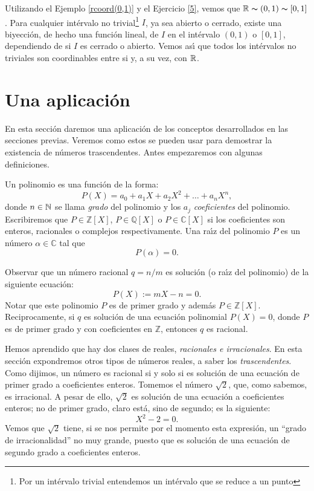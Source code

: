 Utilizando el Ejemplo \vref{rcoord(0,1)} y el Ejercicio \vref{5},
vemos que $\rr\thicksim (0,1)\thicksim [0,1]$. Para cualquier
int\'ervalo no trivial\footnote{Por un int\'ervalo trivial
entendemos un int\'ervalo que se reduce a un punto} $I$,  ya sea
abierto o cerrado, existe una biyecci\'on, de hecho una funci\'on
lineal, de $I$ en el int\'ervalo $(0,1)$ o $[0,1]$, dependiendo de
si $I$ es cerrado o abierto. Vemos as\'{\i} que todos los
int\'ervalos no triviales son coordinables entre si y, a su vez,
con $\rr$.

\section{Una aplicaci\'on}
En esta secci\'on daremos una aplicaci\'on de los conceptos
desarrollados en las secciones previas. Veremos como estos se
pueden usar para demostrar la existencia de n\'umeros
trascendentes. Antes empezaremos con algunas definiciones.

Un polinomio es una funci\'on de la forma:
\[P(X)=a_0+a_1X+a_2X^2+\dots+a_nX^n,\]
donde $n\in\nn$ se llama \emph{grado} del polinomio y los $a_j$
\emph{coeficientes} del polinomio.  Escribiremos que $P\in
\mathbb{Z}[X]$, $P\in\mathbb{Q}[X]$ o $P\in\mathbb{C}[X]$ si los
coeficientes son enteros, racionales o complejos respectivamente.
Una ra\'{\i}z del polinomio $P$ es un n\'umero
$\alpha\in\mathbb{C}$ tal que
\[P(\alpha)=0.\]

Observar que un n\'umero racional $q=n/m$ es soluci\'on (o
ra\'{\i}z del polinomio) de la siguiente ecuaci\'on:
\[P(X):=mX-n=0.\]
Notar que este polinomio $P$ es de primer grado y adem\'as
$P\in\mathbb{Z}[X]$. Reciprocamente, si $q$ es soluci\'on de una
ecuaci\'on polinomial $P(X)=0$, donde $P$ es de primer grado y con
coeficientes en $\mathbb{Z}$, entonces $q$ es racional.

Hemos aprendido que hay dos clases de reales, \emph{racionales e
irracionales}. En esta secci\'on expondremos otros tipos de
n\'umeros reales, a saber los \emph{trascendentes}. Como dijimos,
un n\'umero es racional si y solo si es soluci\'on de una
ecuaci\'on de primer grado a coeficientes enteros. Tomemos el
n\'umero $\sqrt{2}$, que, como sabemos, es irracional. A pesar de
ello, $\sqrt{2}$ es soluci\'on de una ecuaci\'on a coeficientes
enteros; no de primer grado, claro est\'a, sino de segundo; es la
siguiente:
\[X^2-2=0.\]
Vemos que $\sqrt{2}$ tiene, si se nos permite por el momento esta
expresi\'on, un ``grado de irracionalidad'' no muy grande, puesto
que es soluci\'on de una ecuaci\'on de segundo grado a
coeficientes enteros.

